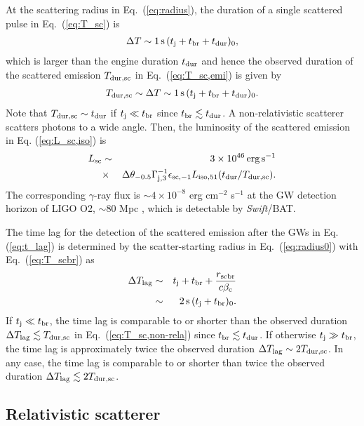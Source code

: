 \documentclass{emulateapj}
\begin{document}
At the scattering radius in Eq.~(\ref{eq:radius}),
the duration of a single scattered pulse in Eq.~(\ref{eq:T_sc}) is
\begin{eqnarray}
\Delta T \sim 1\,{\rm s}\,(t_{\rm j}+t_{\rm br}+t_{\rm dur})_{0},
\end{eqnarray}
which is larger than the engine duration $t_{\rm dur}$
and hence the observed duration of the scattered emission $T_{\rm dur,sc}$
in Eq.~(\ref{eq:T_sc,emi}) is given by
\begin{eqnarray}\label{eq:T_sc,non-rela}
T_{\rm dur,sc} \sim \Delta T \sim 1\,{\rm s}\,(t_{\rm j}+t_{\rm br}+t_{\rm dur})_{0}.
\end{eqnarray}
Note that $T_{\rm dur,sc} \sim t_{\rm dur}$ if $t_{\rm j} \ll t_{\rm br}$ since $t_{\rm br}\lesssim t_{\rm dur}$.
A non-relativistic scatterer scatters photons to a wide angle.
Then, the luminosity of the scattered emission in Eq. (\ref{eq:L_sc,iso}) is
\begin{eqnarray}\label{eq:L_sc,non-rela}
L_{\rm sc} &\sim&3\times10^{46}\,{\rm erg}\,{\rm s}^{-1} \nonumber\\
&\times&\Delta\theta_{-0.5}\Gamma_{\rm j,3}^{-1}\epsilon_{\rm sc,-1} L_{\rm iso,51}
(t_{\rm dur}/T_{\rm dur,sc}).
\end{eqnarray}
The corresponding $\gamma$-ray flux is $\sim4\times10^{-8}$ erg cm$^{-2}$ s$^{-1}$ at the GW detection horizon of LIGO O2, 
$\sim80$ Mpc \citep{2016LRR....19....1A}, which is detectable by {\it Swift}/BAT. 

The time lag for the detection of the scattered emission 
after the GWs in Eq. (\ref{eq:t_lag}) is 
determined by the scatter-starting radius in Eq.~(\ref{eq:radius0})
with Eq.~(\ref{eq:T_scbr}) as
\begin{eqnarray}\label{eq:T_lag,non-rela}
\Delta T_{\rm lag}&\sim&t_{\rm j}+t_{\rm br}+\frac{r_{\rm scbr}}{c\beta_{\rm c}} \nonumber \\
&\sim& 2\,{\rm s}\,(t_{\rm j}+t_{\rm br})_{0}. 
\end{eqnarray}
If $t_{\rm j}\ll t_{\rm br}$, the time lag is comparable to or shorter than the observed duration 
$\Delta T_{\rm lag}\lesssim T_{\rm dur,sc}$ in Eq.~(\ref{eq:T_sc,non-rela}) since $t_{\rm br}\lesssim t_{\rm dur}$. 
If otherwise $t_{\rm j}\gg t_{\rm br}$, the time lag is approximately twice the observed duration
$\Delta T_{\rm lag}\sim 2T_{\rm dur,sc}$. 
In any case, the time lag is comparable to or shorter than twice the observed duration
$\Delta T_{\rm lag}\lesssim 2T_{\rm dur,sc}$. 

\subsection{Relativistic scatterer}\label{sec:rela}
\end{document}
